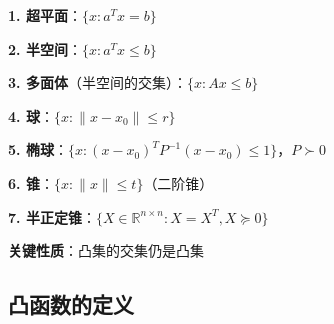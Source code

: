 \documentclass[12pt, a4paper]{ctexart}
\begin{document}
\begin{blackboard}[常见的凸集]

\textbf{1. 超平面}：$\{x : a^T x = b\}$

\textbf{2. 半空间}：$\{x : a^T x \leq b\}$

\textbf{3. 多面体}（半空间的交集）：$\{x : Ax \leq b\}$

\textbf{4. 球}：$\{x : \|x - x_0\| \leq r\}$

\textbf{5. 椭球}：$\{x : (x - x_0)^T P^{-1} (x - x_0) \leq 1\}$，$P \succ 0$

\textbf{6. 锥}：$\{x : \|x\| \leq t\}$（二阶锥）

\textbf{7. 半正定锥}：$\{X \in \mathbb{R}^{n \times n} : X = X^T, X \succeq 0\}$

\textbf{关键性质}：凸集的交集仍是凸集

\end{blackboard}

\subsection{凸函数的定义}
\end{document}
